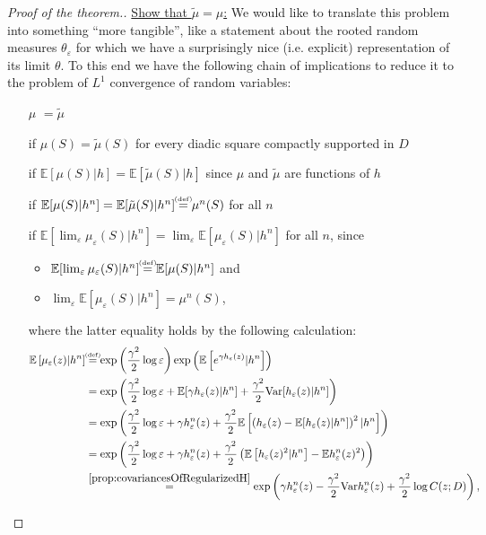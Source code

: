 \documentclass[11pt,reqno]{amsart}
\numberwithin{equation}{section}
\newcommand{\eqby}[1]{\mathrel{\stackrel{#1}{=}}}
\newcommand{\eqbydef}{\mathrel{\stackrel{\hspace*{-3mm}\text{\tiny(def)}\hspace*{-3mm}}{=}}}
\newcommand{\eps}{\varepsilon}
\begin{document}
\begin{proof}[Proof of the theorem.]
	\underline{Show that $\tilde\mu=\mu$:} We would like to translate this problem into something ``more tangible'', like a statement about the rooted random measures $\theta_\eps$ for which we have a surprisingly nice (i.e. explicit) representation of its limit $\theta$.
	To this end we have the following chain of implications to reduce it to the problem of $L^1$ convergence of random variables:
	\begin{itemize}
		\item [$\mu$] $=\tilde\mu$
		\item [if] $\mu(S)=\tilde\mu(S)$ for every diadic square compactly supported in $D$
		\item [if] $\mathbb E[\mu(S)|h]=\mathbb E[\tilde\mu(S)|h]$ since $\mu$ and $\tilde\mu$ are functions of $h$
		\item [if] $\mathbb E[\mu(S)|h^n]=\mathbb E[\tilde\mu(S)|h^n]\eqbydef \mu^n(S)$ for all $n$
		\item [if] $\mathbb E[\lim_\eps\mu_\eps(S)|h^n]=\lim_\eps\mathbb E[\mu_\eps(S)|h^n]$ for all $n$, since \begin{itemize}
				\item $\mathbb E[\lim_\eps\mu_\eps(S)|h^n]\eqbydef\mathbb E[\mu(S)|h^n]$ and
				\item $\lim_\eps\mathbb E[\mu_\eps(S)|h^n] = \mu^n(S)$,
			\end{itemize}
			where the latter equality holds by the following calculation:
			\begin{align*}
				\mathbb E\left[\mu_\eps(z)|h^n\right]&\eqbydef
				\exp\left(\frac{\gamma^2}{2}\log\eps\right)\exp\left(\mathbb E\left[e^{\gamma h_\eps(z)}|h^n\right]\right)\\
				&=\exp\left(\frac{\gamma^2}{2}\log\eps+\mathbb E[\gamma h_\eps(z)|h^n]+\frac{\gamma^2}{2}\text{Var}[h_\eps(z)|h^n]\right)\\
				&=\exp\left(\frac{\gamma^2}{2}\log\eps+\gamma h_\eps^n(z)+\frac{\gamma^2}{2}\mathbb E\left[\left(h_\eps(z)-\mathbb E[h_\eps(z)|h^n]\right)^2|h^n\right]\right)\\
				&=\exp\left(\frac{\gamma^2}{2}\log\eps+\gamma h_\eps^n(z)+\frac{\gamma^2}{2}\left(\mathbb E\left[h_\eps(z)^2|h^n\right]-\mathbb E h^n_\eps(z)^2\right)\right)\\
				&\eqby{\ref{prop:covariancesOfRegularizedH}} \exp\left(\gamma h^n_\eps(z)-\frac{\gamma^2}{2}\text{Var}h^n_\eps(z)+\frac{\gamma^2}{2}\log C(z;D)\right),
			\end{align*}%

\end{itemize}
\end{proof}
\end{document}
